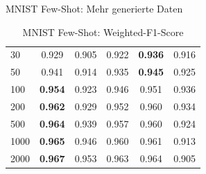 \documentclass[10pt, compress]{beamer}
\begin{document}
\begin{frame}{MNIST Few-Shot: Mehr generierte Daten}
\begin{table}[hbt]
{\begin{tabular}{l|c|c|c|c|c}
30                                                                & 0.929          & 0.905          & 0.922                                                           & \textbf{0.936}                                                  & 0.916     \\
50                                                                & 0.941          & 0.914          & 0.935                                                           & \textbf{0.945}                                                  & 0.925     \\
100                                                               & \textbf{0.954} & 0.923          & 0.946                                                           & 0.951                                                           & 0.936     \\
200                                                               & \textbf{0.962} & 0.929          & 0.952                                                           & 0.960                                                           & 0.934     \\
500                                                               & \textbf{0.964} & 0.939          & 0.957                                                           & 0.960                                                           & 0.924     \\
1000                                                              & \textbf{0.965} & 0.946          & 0.960                                                           & 0.961                                                           & 0.913     \\
2000                                                              & \textbf{0.967} & 0.953          & 0.963                                                           & 0.964                                                           & 0.905     \\
\bottomrule
\end{tabular}}
\caption{MNIST Few-Shot: Weighted-F1-Score}
\end{table}
\end{frame}
\end{document}
